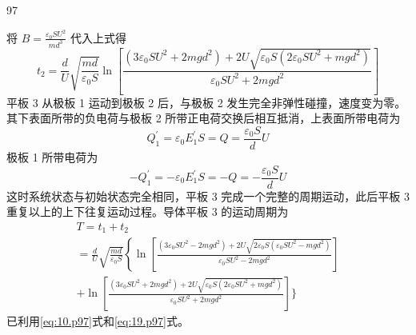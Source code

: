 \begin{solution}{97}
\begin{subsolution}
\begin{equation*}
        \end{equation*}
        将 $B = \frac{\varepsilon_0SU^2}{md^3}$ 代入上式得
        \begin{equation}
            t _ {2} = \frac {d}{U} \sqrt {\frac {m d}{\varepsilon_ {0} S}} \ln \left[ \frac {\left(3 \varepsilon_ {0} S U ^ {2} + 2 m g d ^ {2}\right) + 2 U \sqrt {\varepsilon_ {0} S \left(2 \varepsilon_ {0} S U ^ {2} + m g d ^ {2}\right)}}{\varepsilon_ {0} S U ^ {2} + 2 m g d ^ {2}} \right]
            \label{eq:19.p97}
        \end{equation}
        平板 3 从极板 1 运动到极板 2 后，与极板 2 发生完全非弹性碰撞，速度变为零。其下表面所带的负电荷与极板 2 所带正电荷交换后相互抵消，上表面所带电荷为
        \begin{equation*}
            Q _ {1} ^ {\prime} = \varepsilon_ {0} E _ {1} ^ {\prime} S = Q = \frac {\varepsilon_ {0} S}{d} U
        \end{equation*}
        极板 1 所带电荷为
        \begin{equation*}
            - Q _ {1} ^ {\prime} = - \varepsilon_ {0} E _ {1} ^ {\prime} S = - Q = - \frac {\varepsilon_ {0} S}{d} U
        \end{equation*}
        这时系统状态与初始状态完全相同，平板 3 完成一个完整的周期运动，此后平板 3 重复以上的上下往复运动过程。导体平板 3 的运动周期为
        \begin{equation}
            \begin{array}{l} T = t _ {1} + t _ {2} \\ = \frac {d}{U} \sqrt {\frac {m d}{\varepsilon_ {0} S}} \left\{\ln \left[ \frac {(3 \varepsilon_ {0} S U ^ {2} - 2 m g d ^ {2}) + 2 U \sqrt {2 \varepsilon_ {0} S (\varepsilon_ {0} S U ^ {2} - m g d ^ {2})}}{\varepsilon_ {0} S U ^ {2} - 2 m g d ^ {2}} \right] \right. \\ + \ln \left[ \frac {(3 \varepsilon_ {0} S U ^ {2} + 2 m g d ^ {2}) + 2 U \sqrt {\varepsilon_ {0} S (2 \varepsilon_ {0} S U ^ {2} + m g d ^ {2})}}{\varepsilon_ {0} S U ^ {2} + 2 m g d ^ {2}} \right] \Bigg \} \end{array}
            \label{eq:20.p97}
        \end{equation}
        已利用\eqref{eq:10.p97}式和\eqref{eq:19.p97}式。
    \end{subsolution}
\end{solution}